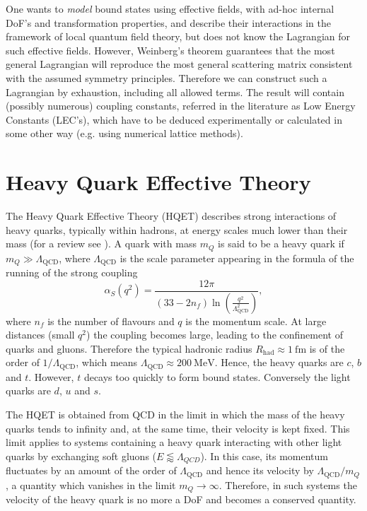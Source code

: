 One wants to \emph{model} bound states using effective fields, with ad-hoc internal DoF's and transformation properties, and describe their interactions in the framework of local quantum field theory, but does not know the Lagrangian for such effective fields. However, Weinberg's theorem guarantees that the most general Lagrangian will reproduce the most general scattering matrix consistent with the assumed symmetry principles. Therefore we can construct such a Lagrangian by exhaustion, including all allowed terms. The result will contain (possibly numerous) coupling constants, referred in the literature as Low Energy Constants (LEC's), which have to be deduced experimentally or calculated in some other way (e.g. using numerical lattice methods).

\section{Heavy Quark Effective Theory}
The Heavy Quark Effective Theory (HQET) describes strong interactions of heavy quarks, typically within hadrons, at energy scales much lower than their mass (for a review see \cite{Neubert:1993mb}). A quark with mass $m_Q$ is said to be a heavy quark if $m_Q \gg \Lambda_\text{QCD}$, where $\Lambda_\text{QCD}$ is the scale parameter appearing in the formula of the running of the strong coupling
\begin{equation}
  \alpha_S \left( q^2 \right) = \frac{12 \pi}{\left( 33 - 2 n_f \right) \ln \left( \frac{q^2}{\Lambda_\text{QCD}^2} \right)} ,
\end{equation}
where $n_f$ is the number of flavours and $q$ is the momentum scale. At large distances (small $q^2$) the coupling becomes large, leading to the confinement of quarks and gluons. Therefore the typical hadronic radius $R_\text{had} \approx 1 \ \text{fm}$ is of the order of $1 / \Lambda_\text{QCD}$, which means $\Lambda_\text{QCD} \approx 200 \ \text{MeV}$. Hence, the heavy quarks are $c$, $b$ and $t$. However, $t$ decays too quickly to form bound states. Conversely the light quarks are $d$, $u$ and $s$.

The HQET is obtained from QCD in the limit in which the mass of the heavy quarks tends to infinity and, at the same time, their velocity is kept fixed. This limit applies to systems containing a heavy quark interacting with other light quarks by exchanging soft gluons ($E \lessapprox \Lambda_{QCD}$). In this case, its momentum fluctuates by an amount of the order of $\Lambda_\text{QCD}$ and hence its velocity by $\Lambda_\text{QCD}/m_Q$, a quantity which vanishes in the limit $m_Q \to \infty$. Therefore, in such systems the velocity of the heavy quark is no more a DoF and becomes a conserved quantity.

